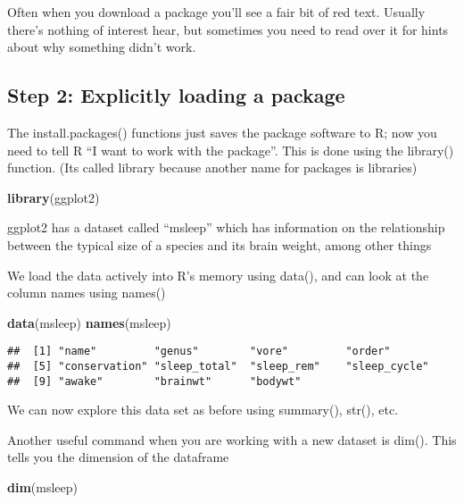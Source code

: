 \documentclass[]{book}
\newenvironment{Shaded}{\begin{snugshade}}{\end{snugshade}}
\newcommand{\KeywordTok}[1]{\textcolor[rgb]{0.13,0.29,0.53}{\textbf{#1}}}
\newcommand{\NormalTok}[1]{#1}
\theoremstyle{definition}
\theoremstyle{definition}
\theoremstyle{definition}
\theoremstyle{remark}
\begin{document}
Often when you download a package you'll see a fair bit of red text.
Usually there's nothing of interest hear, but sometimes you need to read
over it for hints about why something didn't work.

\subsection{Step 2: Explicitly loading a
package}\label{step-2-explicitly-loading-a-package}

The install.packages() functions just saves the package software to R;
now you need to tell R ``I want to work with the package''. This is done
using the library() function. (Its called library because another name
for packages is libraries)

\begin{Shaded}
\begin{Highlighting}[]
\KeywordTok{library}\NormalTok{(ggplot2)}
\end{Highlighting}
\end{Shaded}

ggplot2 has a dataset called ``msleep'' which has information on the
relationship between the typical size of a species and its brain weight,
among other things

We load the data actively into R's memory using data(), and can look at
the column names using names()

\begin{Shaded}
\begin{Highlighting}[]
\KeywordTok{data}\NormalTok{(msleep)}
\KeywordTok{names}\NormalTok{(msleep)}
\end{Highlighting}
\end{Shaded}

\begin{verbatim}
##  [1] "name"         "genus"        "vore"         "order"       
##  [5] "conservation" "sleep_total"  "sleep_rem"    "sleep_cycle" 
##  [9] "awake"        "brainwt"      "bodywt"
\end{verbatim}

We can now explore this data set as before using summary(), str(), etc.

Another useful command when you are working with a new dataset is dim().
This tells you the dimension of the dataframe

\begin{Shaded}
\begin{Highlighting}[]
\KeywordTok{dim}\NormalTok{(msleep)}
\end{Highlighting}
\end{Shaded}
\end{document}
